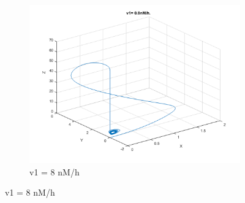 \documentclass[10pt,a4paper,oneside,twocolumn]{article}
\numberwithin{equation}{section} %
\begin{document}
\begin{figure}
\begin{subfigure}[b]{0.3\textwidth}
	    \includegraphics[width=\textwidth]{LotsofthesameA/A-AA8.png}
	    \caption{v1 = 8 nM/h}
	\end{subfigure}
	 

\end{figure}
\end{document}

